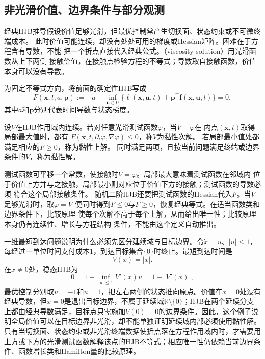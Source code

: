 \subsection{非光滑价值、边界条件与部分观测}
经典HJB推导假设价值足够光滑，但最优控制常产生切换面、状态约束或不可微终端成本。
此时价值可能连续，却没有处处可用的梯度或Hessian矩阵。困难在于方程含有导数，不能
把一个折点直接代入经典公式。（viscosity solution）用光滑函数从上下两侧
接触价值，在接触点检验方程的不等式；导数取自接触函数，价值本身可以没有导数。

为固定不等式方向，将前面的确定性HJB写成
\[
  F(\bm x,t,a,\bm p)
  :=-a-\inf_{\bm u\in U}\{\ell(\bm x,\bm u,t)
                       +\bm p^\top\bm f(\bm x,\bm u,t)\}=0,
\]
其中$a$和$\bm p$分别代表时间导数与状态梯度。
\begin{definition}[连续价值函数的黏性解]
  \label{def:control-viscosity-solution}
  设$V$在HJB作用域内连续。若对任意光滑测试函数$\varphi$，当$V-\varphi$在
  内点$(\bm x,t)$取得局部最大值时，都有
  $F(\bm x,t,\partial_t\varphi,\nabla\varphi)\leq0$，称$V$为黏性次解。
  若局部最小值处都满足相应的$F\geq0$，称为黏性上解。
  同时满足两项，且按当前问题满足终端或边界条件的$V$，称为黏性解。
\end{definition}
测试函数可平移一个常数，使接触时$V=\varphi$。局部最大意味着测试函数在邻域内
位于价值上方并与之接触，局部最小则对应位于价值下方的接触；测试函数的导数必须
符合这个局部接触条件。
随机二阶HJB还要把测试函数的Hessian代入$F$。当$V$足够光滑时，取$\varphi=V$
便同时得到$F\leq0$与$F\geq0$，恢复经典等式。在适当函数类和边界条件下，比较原理
使每个次解不高于每个上解，从而给出唯一性；比较原理本身仍有连续性、增长与方程结构
条件，不能由这个定义自动推出。

一维最短到达问题说明为什么必须先区分延续域与目标边界。令$\dot x=u$、$|u|\leq1$，每经过一单位时间支付成本$1$，到达目标集合$\{0\}$时终止。最短到达时间是
\[
  V(x)=|x|.
\]
在$x\neq0$处，稳态HJB为
\[
  0
  =
  1+\inf_{|u|\leq1}V'(x)u
  =
  1-|V'(x)|,
\]
最优控制分别取$u=-1$和$u=1$，把左右两侧的状态推向原点。价值在$x=0$处没有经典导数，但$x=0$是退出目标边界，不属于延续域$\mathbb{R}\setminus\{0\}$；HJB在两个延续分支上都由经典导数满足，目标点只需施加$V(0)=0$的边界条件。因此，这个例子说明全局价值可以在目标边界非光滑，却不能单独证明延续域内部必须使用黏性解。只有当切换面、状态约束或非光滑终端数据使折点落在方程作用域内时，才需要用上方或下方的光滑测试函数解释该点的HJB不等式；相应唯一性仍依赖当前边界条件、函数增长类和Hamilton量的比较原理。

